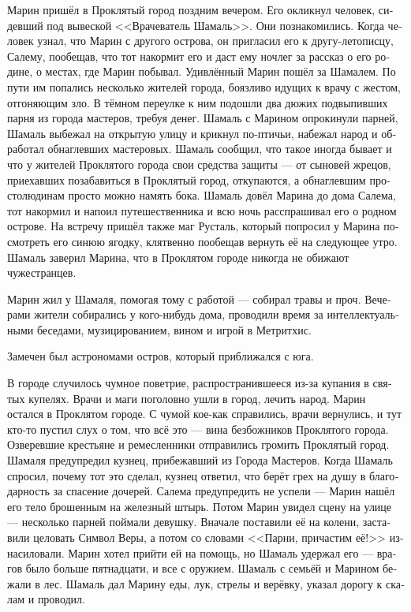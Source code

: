 \documentclass[a4paper,12pt,fleqn]{book}\usepackage{cooltooltips}\usepackage{polyglossia}\setdefaultlanguage[babelshorthands=true]{russian}\setotherlanguage{english}\defaultfontfeatures{Ligatures=TeX,Mapping=tex-text} \usepackage{xcolor}\definecolor{lightgray}{HTML}{bbbbbb}\color{lightgray}\newcommand{\ml}[3]{\textenglish{\textcolor{black}{#3}}}
\begin{document}
{Марин пришёл в Проклятый город поздним вечером.
Его окликнул человек, сидевший под вывеской <<Врачеватель Шамаль>>.
Они познакомились.
Когда человек узнал, что Марин с другого острова, он пригласил его к другу-летописцу, Салему, пообещав, что тот накормит его и даст ему ночлег за рассказ о его родине, о местах, где Марин побывал.
Удивлённый Марин пошёл за Шамалем.
По пути им попались несколько жителей города, боязливо идущих к врачу с жестом, отгоняющим зло.
В тёмном переулке к ним подошли два дюжих подвыпивших парня из города мастеров, требуя денег.
Шамаль с Марином опрокинули парней, Шамаль выбежал на открытую улицу и крикнул по-птичьи, набежал народ и обработал обнаглевших мастеровых.
Шамаль сообщил, что такое иногда бывает и что у жителей Проклятого города свои средства защиты --- от сыновей жрецов, приехавших позабавиться в Проклятый город, откупаются, а обнаглевшим простолюдинам просто можно намять бока.
Шамаль довёл Марина до дома Салема, тот накормил и напоил путешественника и всю ночь расспрашивал его о родном острове.
На встречу пришёл также маг Русталь, который попросил у Марина посмотреть его синюю ягодку, клятвенно пообещав вернуть её на следующее утро.
Шамаль заверил Марина, что в Проклятом городе никогда не обижают чужестранцев.

Марин жил у Шамаля, помогая тому с работой --- собирал травы и проч.
Вечерами жители собирались у кого-нибудь дома, проводили время за интеллектуальными беседами, музицированием, вином и игрой в Метритхис.

Замечен был астрономами остров, который приближался с юга.

В городе случилось чумное поветрие, распространившееся из-за купания в святых купелях.
Врачи и маги поголовно ушли в город, лечить народ.
Марин остался в Проклятом городе.
С чумой кое-как справились, врачи вернулись, и тут кто-то пустил слух о том, что всё это --- вина безбожников Проклятого города.
Озверевшие крестьяне и ремесленники отправились громить Проклятый город.
Шамаля предупредил кузнец, прибежавший из Города Мастеров.
Когда Шамаль спросил, почему тот это сделал, кузнец ответил, что берёт грех на душу в благодарность за спасение дочерей.
Салема предупредить не успели --- Марин нашёл его тело брошенным на железный штырь.
Потом Марин увидел сцену на улице --- несколько парней поймали девушку.
Вначале поставили её на колени, заставили целовать Символ Веры, а потом со словами <<Парни, причастим её!>> изнасиловали.
Марин хотел прийти ей на помощь, но Шамаль удержал его --- врагов было больше пятнадцати, и все с оружием.
Шамаль с семьёй и Марином бежали в лес.
Шамаль дал Марину еды, лук, стрелы и верёвку, указал дорогу к скалам и проводил.

}
\end{document}

